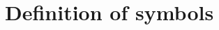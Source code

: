 \documentclass[11pt,a4paper]{article}
\begin{document}
\hspace*{2cm}
\section*{\Large Definition of symbols} 

\tableofcontents
\clearpage
\end{document}
